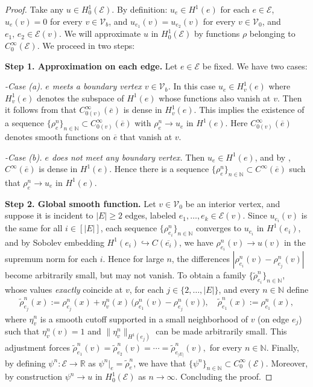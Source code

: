 \documentclass[a4paper, 10pt, english]{article}
\def\N{\mathbb N}
\def\to{\rightarrow}
\begin{document}
\begin{proof} Take any $u \in H_0^1(\mathcal{E})$. By definition: $u_e \in H^1(e)$ for each $e \in \mathcal{E}$, $u_e(v) = 0$ for every $v\in \mathcal{V}_b$, and $ u_{e_1}(v) = u_{e_2}(v)$ for every $v\in \mathcal{V}_0$, and $e_1,\,e_2 \in \mathcal{E}(v)$. We will approximate $u$ in $H_0^1(\mathcal{E})$ by functions $\rho$ belonging to $C^\infty_0(\mathcal{E})$. We proceed in two steps:
\smallbreak

\noindent
\textbf{Step 1. Approximation on each edge.}
Let $e \in \mathcal{E}$ be fixed. We have two cases:

\noindent
\emph{-Case (a). $e$ meets a boundary vertex $v \in \mathcal{V}_b$.}
In this case  $u_e \in H^1_v(e)$ where $H^1_v(e)$ denotes the subspace of $H^1(e)$ whose functions also vanish at $v$. Then it follows from \cite[Section 8.3]{brezis_book} that $C^\infty_{0(v)}(\overline{e})$ is dense in $H^1_v(e)$. This implies the existence of a sequence $\{\rho_e^n\}_{n\in \N}\subset C^\infty_{0(v)}(\overline{e})$ with $\rho_e^n \to u_e$ in $H^1(e)$. Here $C^\infty_{0(v)}(\overline{e})$ denotes smooth functions on $\overline{e}$ that vanish at $v$.

\noindent
\emph{-Case (b). $e$ does not meet any boundary vertex.}
Then $u_e \in H^1(e)$, and by \cite[Section 5.3.3]{evans_book}, $C^\infty(\overline{e})$ is dense in $H^1(e)$. Hence there is a sequence $\{\rho_e^n\}_{n\in \N}\subset C^\infty(\overline{e})$ such that $\rho_e^n\to u_e$ in $H^1(e)$.
\smallbreak


\noindent
\textbf{Step 2. Global smooth function.}
Let $v \in \mathcal{V}_0$ be an interior vertex, and suppose it is incident to $|E| \ge 2$ edges, labeled $e_1,\dots,e_k \in \mathcal{E}(v)$. Since $u_{e_i}(v)$ is the same for all $i\in[|E|]$, each sequence $\{\rho_{e_i}^n\}_{n\in \N}$ converges to $u_{e_i}$ in $H^1(e_i)$, and by Sobolev embedding $H^1(e_i)\hookrightarrow C(\overline{e_i})$, we have $\rho_{e_i}^n(v)\to u(v)$ in the supremum norm for each $i$. Hence for large $n$, the differences $|\rho_{e_i}^n(v)-\rho_{e_j}^n(v)|$ become arbitrarily small, but may not vanish. To obtain a family $\{\tilde{\rho}_{e_i}^n\}_{n\in\N}$, whose values \emph{exactly} coincide at $v$, for each $j\in \{2,\dots,|E|\}$, and every $n\in \N$ define
\begin{align*}
\tilde{\rho}_{e_j}^n(x)
:=
\rho_{e_j}^n(x) 
+ 
\eta_v^n(x)\,\bigl(\rho_{e_1}^n(v)-\rho_{e_j}^n(v)\bigr),
\quad
\tilde{\rho}_{e_1}^n(x) := \rho_{e_1}^n(x),
\end{align*}
where $\eta_v^n$ is a smooth cutoff supported in a small neighborhood of $v$ (on edge $e_j$) such that $\eta_v^n(v)=1$ and $\|\eta_v^n\|_{H^1(e_j)}$ can be made arbitrarily small. This adjustment forces $\tilde{\rho}_{e_1}^n(v) 
=
\tilde{\rho}_{e_2}^n(v)
=\cdots=
\tilde{\rho}_{e_{|E|}}^n(v),$ for every $n\in \N$. Finally, by defining $\psi^n \colon \mathcal{E}\to \mathbb{R}$ as $\psi^n|_e =\tilde{\rho}_e^n$, we have that $\{\psi^n\}_{n\in \N}\subset C^\infty_0(\mathcal{E})$. Moreover, by construction $\psi^n\to u$ in $H_0^1(\mathcal{E})$ as $n\to \infty$. Concluding the proof.

\end{proof}
\end{document}
